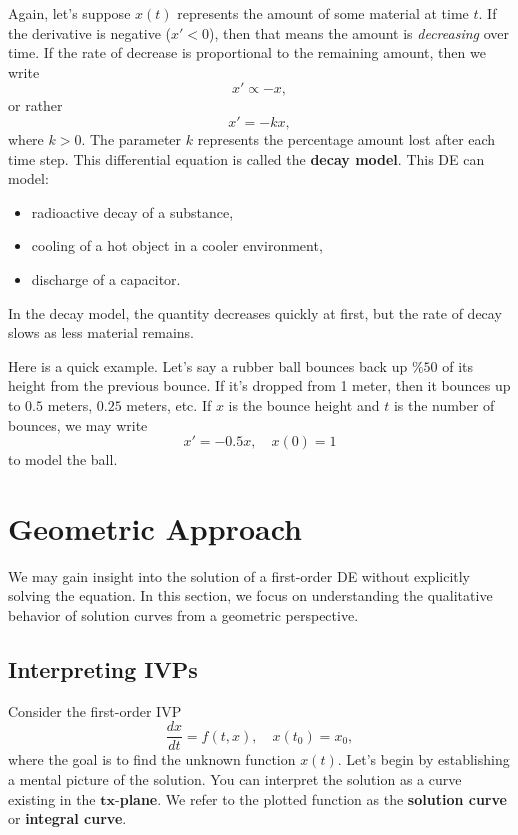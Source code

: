 \documentclass[10pt,letterpaper]{article}
\begin{document}
Again, let's suppose $x(t)$ represents the amount of some material at time $t$. If the derivative is negative ($x'<0$), then that means the amount is \textit{decreasing} over time. If the rate of decrease is proportional to the remaining amount, then we write
\[
x' \propto -x,
\]
or rather
\[
x' = -kx,
\]
where $k>0$. The parameter $k$ represents the percentage amount lost after each time step. This differential equation is called the \textbf{decay model}.  This DE can model:
\begin{itemize}
    \item radioactive decay of a substance,
    \item cooling of a hot object in a cooler environment,
    \item discharge of a capacitor.
\end{itemize}
In the decay model, the quantity decreases quickly at first, but the rate of decay slows as less material remains. 

Here is a quick example. Let's say a rubber ball bounces back up $\%50$ of its height from the previous bounce. If it's dropped from 1 meter, then it bounces up to $0.5$ meters, $0.25$ meters, etc. If $x$ is the bounce height and $t$ is the number of bounces, we may write
$$
x' = -0.5 x,\quad x(0)=1
$$
to model the ball.


\section{Geometric Approach}
We may gain insight into the solution of a first-order DE without explicitly solving the equation. In this section, we focus on understanding the qualitative behavior of solution curves from a geometric perspective.

\subsection{Interpreting IVPs}

Consider the first-order IVP
$$
\frac{dx}{dt} = f(t,x),\quad x(t_0)=x_0,
$$
where the goal is to find the unknown function $x(t)$. Let's begin by establishing a mental picture of the solution. You can interpret the solution as a curve existing in the $\mathbf{tx}$-\textbf{plane}. We refer to the plotted function as the \textbf{solution curve} or \textbf{integral curve}. 
\end{document}
